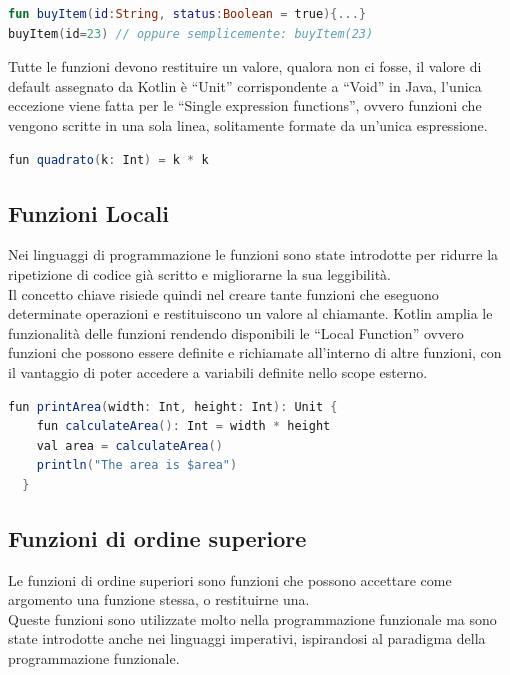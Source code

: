 \begin{lstlisting}[language=kotlin,caption={Esempio Kotlin Parametri}]
fun buyItem(id:String, status:Boolean = true){...}
buyItem(id=23) // oppure semplicemente: buyItem(23)
\end{lstlisting}

Tutte le funzioni devono restituire un valore, qualora non ci fosse, il valore di default assegnato da Kotlin è ``Unit'' corrispondente a ``Void'' in Java, l'unica eccezione viene fatta per le ``Single expression functions'', ovvero funzioni che vengono scritte in una sola linea, solitamente formate da un'unica espressione.
\begin{lstlisting}[language=java,caption={Esempio Single Expression Function in Kotlin}]
fun quadrato(k: Int) = k * k
\end{lstlisting}

\subsection{Funzioni Locali}
Nei linguaggi di programmazione le funzioni sono state introdotte per ridurre la ripetizione di codice già scritto e migliorarne la sua leggibilità.\\
Il concetto chiave risiede quindi nel creare tante funzioni che eseguono determinate operazioni e restituiscono un valore al chiamante.
Kotlin amplia le funzionalità delle funzioni rendendo disponibili le ``Local Function'' ovvero funzioni che possono essere definite e richiamate all'interno di altre funzioni, con il vantaggio di poter accedere a variabili definite nello scope esterno.

\begin{lstlisting}[language=java,caption={Esempio Funzioni locali}]
  fun printArea(width: Int, height: Int): Unit {
    fun calculateArea(): Int = width * height
    val area = calculateArea()
    println("The area is $area")
  }
\end{lstlisting}

\subsection{Funzioni di ordine superiore }
Le funzioni di ordine superiori sono funzioni che possono accettare come argomento una funzione stessa, o restituirne una.\\
Queste funzioni sono utilizzate molto nella programmazione funzionale ma sono state introdotte anche nei linguaggi imperativi, ispirandosi al paradigma della programmazione funzionale. \\

